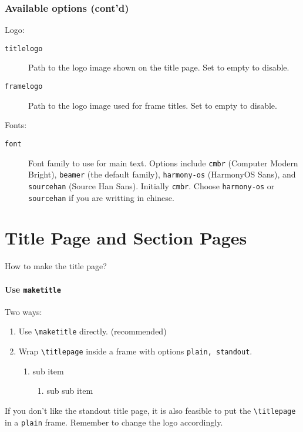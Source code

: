 \documentclass[no-math, aspectratio=1610, 10pt]{beamer}
\begin{document}
    \begin{frame}
        \frametitle{Available options (cont'd)}

        Logo:
        \begin{description}
            \item[\texttt{titlelogo}] Path to the logo image shown on the title page. Set to empty to disable.
            \item[\texttt{framelogo}] Path to the logo image used for frame titles. Set to empty to disable. 
        \end{description}
    
        Fonts:
        \begin{description}
            \item[\texttt{font}] 
            Font family to use for main text. Options include \texttt{cmbr} (Computer Modern Bright), \texttt{beamer} (the default family), \texttt{harmony-os} (HarmonyOS Sans), and \texttt{sourcehan} (Source Han Sans). Initially \texttt{cmbr}. Choose \texttt{harmony-os} or \texttt{sourcehan} if you are writting in chinese.
        \end{description}
    \end{frame}

    \section{Title Page and Section Pages}

    \begin{frame}[fragile]{How to make the title page?}
        \framesubtitle{Use \texttt{maketitle}}
        Two ways:
        \begin{enumerate}
            \item Use \verb|\maketitle| directly. (recommended)
            \item Wrap \verb|\titlepage| inside a frame with options \texttt{plain, standout}.
            \begin{enumerate}
                \item sub item
                \begin{enumerate}
                    \item sub sub item
                \end{enumerate}
            \end{enumerate}
        \end{enumerate}

        If you don't like the standout title page, it is also feasible to put the \verb|\titlepage| in a \texttt{plain} frame. Remember to change the logo accordingly.
    \end{frame}
\end{document}
